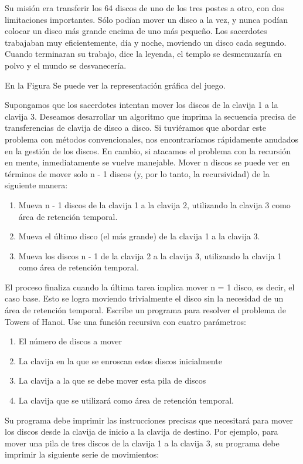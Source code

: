 Su misión era transferir los 64 discos de uno de los tres postes a otro, con dos limitaciones importantes. Sólo podían mover un disco a la vez, y nunca podían colocar un disco más grande encima de uno más pequeño. Los sacerdotes trabajaban muy eficientemente, día y noche, moviendo un disco cada segundo. Cuando terminaran su trabajo, dice la leyenda, el templo se desmenuzaría en polvo y el mundo se desvanecería.

En la Figura  Se puede ver la representación gráfica del juego.

Supongamos que los sacerdotes intentan mover los discos de la clavija 1 a la clavija 3. Deseamos desarrollar un algoritmo que imprima la secuencia precisa de transferencias de clavija de disco a disco.
Si tuviéramos que abordar este problema con métodos convencionales, nos encontraríamos rápidamente anudados en la gestión de los discos. En cambio, si atacamos el problema con la recursión en mente, inmediatamente se vuelve manejable. Mover n discos se puede ver en términos de mover solo n - 1 discos (y, por lo tanto, la recursividad) de la siguiente manera:
\begin{enumerate}
  \item Mueva n - 1 discos de la clavija 1 a la clavija 2, utilizando la clavija 3 como área de retención temporal.
  \item Mueva el último disco (el más grande) de la clavija 1 a la clavija 3.
  \item Mueva los discos n - 1 de la clavija 2 a la clavija 3, utilizando la clavija 1 como área de retención temporal.
\end{enumerate}
El proceso finaliza cuando la última tarea implica mover n = 1 disco, es decir, el caso base. Esto se logra moviendo trivialmente el disco sin la necesidad de un área de retención temporal.
Escribe un programa para resolver el problema de Towers of Hanoi. Use una función recursiva con cuatro parámetros:
\begin{enumerate}
  \item El número de discos a mover
  \item La clavija en la que se enroscan estos discos inicialmente
  \item La clavija a la que se debe mover esta pila de discos
  \item La clavija que se utilizará como área de retención temporal.
\end{enumerate}
Su programa debe imprimir las instrucciones precisas que necesitará para mover los discos desde la clavija de inicio a la clavija de destino. Por ejemplo, para mover una pila de tres discos de la clavija 1 a la clavija 3, su programa debe imprimir la siguiente serie de movimientos:

